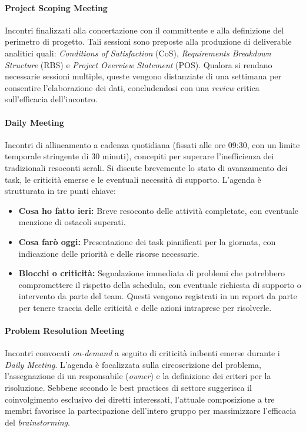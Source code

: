 \documentclass[12pt, a4paper]{article}
\begin{document}
\paragraph{Project Scoping Meeting}
Incontri finalizzati alla concertazione con il committente e alla definizione del perimetro di progetto. Tali sessioni sono preposte alla produzione di deliverable analitici quali: \textit{Conditions of Satisfaction} (CoS), \textit{Requirements Breakdown Structure} (RBS) e \textit{Project Overview Statement} (POS). 
Qualora si rendano necessarie sessioni multiple, queste vengono distanziate di una settimana per consentire l'elaborazione dei dati, concludendosi con una \textit{review} critica sull'efficacia dell'incontro.

\paragraph{Daily Meeting}
Incontri di allineamento a cadenza quotidiana (fissati alle ore 09:30, con un limite temporale stringente di 30 minuti), concepiti per superare l'inefficienza dei tradizionali resoconti serali. 
Si discute brevemente lo stato di avanzamento dei task, le criticità emerse e le eventuali necessità di supporto. L'agenda è strutturata in tre punti chiave:
\begin{itemize}
    \item \textbf{Cosa ho fatto ieri:} Breve resoconto delle attività completate, con eventuale menzione di ostacoli superati.
    \item \textbf{Cosa farò oggi:} Presentazione dei task pianificati per la giornata, con indicazione delle priorità e delle risorse necessarie.
    \item \textbf{Blocchi o criticità:} Segnalazione immediata di problemi che potrebbero compromettere il rispetto della schedula, con eventuale richiesta di supporto o intervento da parte del team. Questi vengono registrati in un report da parte per tenere traccia delle criticità e delle azioni intraprese per risolverle.
\end{itemize}

\paragraph{Problem Resolution Meeting}
Incontri convocati \textit{on-demand} a seguito di criticità inibenti emerse durante i \textit{Daily Meeting}. L'agenda è focalizzata sulla circoscrizione del problema, l'assegnazione di un responsabile (\textit{owner}) e la definizione dei criteri per la risoluzione. Sebbene secondo le best practices di settore suggerisca il coinvolgimento esclusivo dei diretti interessati, l'attuale composizione a tre membri favorisce la partecipazione dell'intero gruppo per massimizzare l'efficacia del \textit{brainstorming}.
\end{document}
